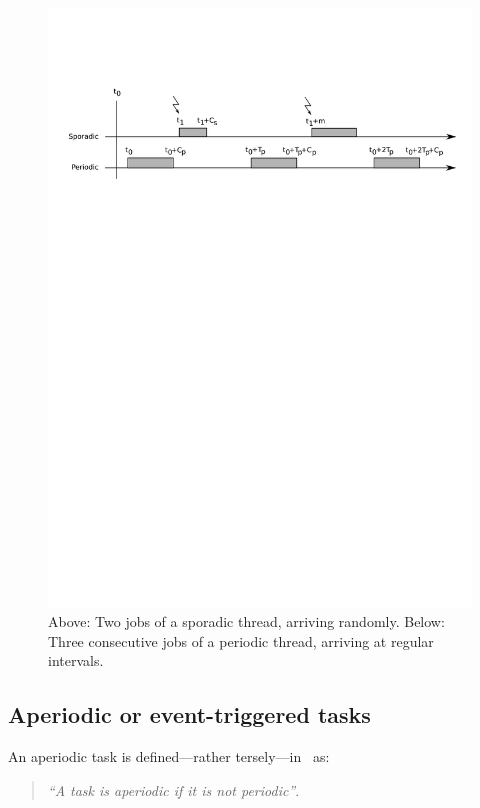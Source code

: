\begin{figure}
\centering
\includegraphics[scale=0.6]{figs/thread_timeline}
\caption[Real-time threads and their jobs.]{Above: Two jobs of a
  sporadic thread, arriving randomly. Below: Three consecutive jobs of
  a periodic thread, arriving at regular intervals.}
\label{fig:thread_timeline}
\end{figure}

\subsection{Aperiodic or event-triggered tasks}
An aperiodic task is defined---rather tersely---in~\cite{sha@rts04}
as:

\begin{quote}
\emph{``A task is aperiodic if it is not periodic''}. 
\end{quote}

